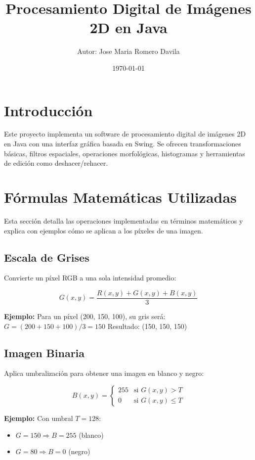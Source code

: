 \documentclass[12pt]{article}
\title{Procesamiento Digital de Imágenes 2D en Java}
\author{Autor: Jose Maria Romero Davila}
\date{\today}
\begin{document}
\maketitle
\tableofcontents
\newpage

\section{Introducción}

Este proyecto implementa un software de procesamiento digital de imágenes 2D en Java con una interfaz gráfica basada en Swing. Se ofrecen transformaciones básicas, filtros espaciales, operaciones morfológicas, histogramas y herramientas de edición como deshacer/rehacer.

\section{Fórmulas Matemáticas Utilizadas}

Esta sección detalla las operaciones implementadas en términos matemáticos y explica con ejemplos cómo se aplican a los píxeles de una imagen.

\subsection{Escala de Grises}

Convierte un píxel RGB a una sola intensidad promedio:

\[
G(x, y) = \frac{R(x, y) + G(x, y) + B(x, y)}{3}
\]

\textbf{Ejemplo:}  
Para un píxel (200, 150, 100), su gris será:  
$G = (200 + 150 + 100)/3 = 150$  
Resultado: (150, 150, 150)

\subsection{Imagen Binaria}

Aplica umbralización para obtener una imagen en blanco y negro:

\[
B(x, y) =
\begin{cases}
255 & \text{si } G(x, y) > T \\
0   & \text{si } G(x, y) \leq T
\end{cases}
\]

\textbf{Ejemplo:}  
Con umbral $T=128$:  
\begin{itemize}
  \item $G=150 \Rightarrow B=255$ (blanco)
  \item $G=80 \Rightarrow B=0$ (negro)
\end{itemize}
\end{document}
